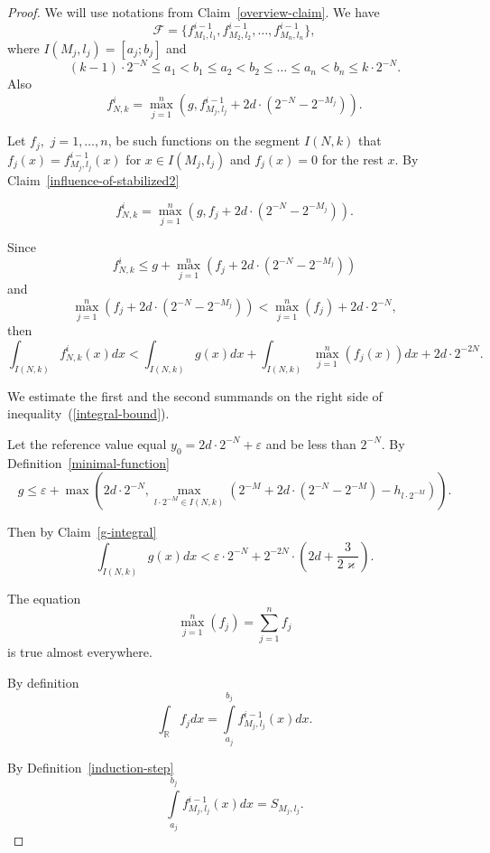 \documentclass[12pt]{article}
\theoremstyle{definition}
\begin{document}
\begin{proof}
We will use notations from Claim~\ref{overview-claim}. We have
$$
\mathcal F = \{f_{M_1,l_1}^{i-1}, f_{M_2, l_2}^{i-1}, \dots, f_{M_n, l_n}^{i-1}\},
$$ where $I(M_j,l_j) = [a_j; b_j]$ and
$$
(k-1)\cdot2^{-N} \le a_1 < b_1 \le a_2 < b_2 \le \dots \le a_n < b_n\le k\cdot2^{-N}.
$$
Also
\begin{equation}
\label{f-is-maximum}
f_{N,k}^i = \max\limits_{j = 1}^n\left(g, f_{M_j,l_j}^{i-1} + 2d\cdot\left(2^{-N}-2^{-M_j}\right)\right).
\end{equation}

Let $f_j,$ $j=1,\dots,n$, be such functions on the segment $I(N,k)$ that $f_j(x) = f_{M_j,l_j}^{i-1}(x)$ for $x\in I(M_j,l_j)$ and $f_j(x) = 0$ for the rest $x$. By Claim~\ref{influence-of-stabilized2}

$$
f_{N,k}^i = \max\limits_{j = 1}^n\left(g, f_j + 2d\cdot\left(2^{-N}-2^{-M_j}\right)\right).
$$

Since
$$
f_{N,k}^i \le g + \max\limits_{j = 1}^n\left(f_j + 2d\cdot\left(2^{-N}-2^{-M_j}\right)\right)
$$
and
$$\max\limits_{j = 1}^n\left(f_j + 2d\cdot\left(2^{-N}-2^{-M_j}\right)\right) < \max\limits_{j=1}^n\left(f_j\right) + 2d\cdot2^{-N}, 
$$
then
\begin{equation}
\label{integral-bound}
\int_{I(N,k)}f_{N,k}^i(x)dx < \int_{I(N,k)} g(x)dx + \int_{I(N,k)} \max\limits_{j=1}^n\left( f_j(x)\right) dx + 2d\cdot2^{-2N}.
\end{equation}

We estimate the first and the second summands on the right side of inequality~(\ref{integral-bound}).

Let the reference value equal $y_0 = 2d\cdot2^{-N} + \varepsilon$ and be less than $2^{-N}.$ By Definition~\ref{minimal-function}
$$
g \le 
\varepsilon + 
\max\left(2d\cdot2^{-N},  \max\limits_{l\cdot2^{-M}\in I(N,k)}\left(2^{-M} + 2d\cdot\left(2^{-N} - 2^{-M}\right) -h_{l\cdot2^{-M}}\right)\right).
$$


Then by Claim~\ref{g-integral}
$$
\int_{I(N,k)} g(x)dx
<
\varepsilon \cdot2^{-N} + 
2^{-2N}\cdot\left(2d + \frac3{2\varkappa}\right).
$$

The equation 
$$
\max\limits_{j=1}^n\left(f_j\right)
=
\sum\limits_{j=1}^n f_j
$$
is true almost everywhere.

By definition
$$
\int_{\mathbb R} f_j dx = \int\limits_{a_j}^{b_j} f_{M_j,l_j}^{i-1}(x) dx.
$$

By Definition~\ref{induction-step}
$$
\int\limits_{a_j}^{b_j} f_{M_j,l_j}^{i-1}(x) dx = S_{M_j, l_j}.
$$


\end{proof}
\end{document}
